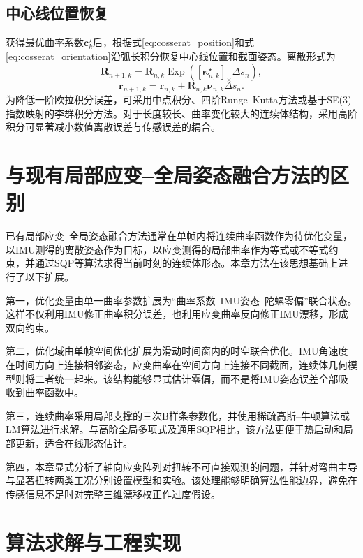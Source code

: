 \subsection{中心线位置恢复}

获得最优曲率系数$\bm c_k^{\star}$后，根据式\eqref{eq:cosserat_position}和式\eqref{eq:cosserat_orientation}沿弧长积分恢复中心线位置和截面姿态。离散形式为
\begin{equation}
    \bm R_{n+1,k}
    =\bm R_{n,k}
    \operatorname{Exp}\left(
    [\bm\kappa_{n,k}^{\star}]_{\times}\Delta s_n
    \right),
\end{equation}
\begin{equation}
    \bm r_{n+1,k}
    =\bm r_{n,k}
    +\bm R_{n,k}\bm\nu_{n,k}\Delta s_n.
    \label{eq:centerline_discrete_integration}
\end{equation}
为降低一阶欧拉积分误差，可采用中点积分、四阶Runge--Kutta方法或基于SE(3)指数映射的李群积分方法。对于长度较长、曲率变化较大的连续体结构，采用高阶积分可显著减小数值离散误差与传感误差的耦合。

\section{与现有局部应变--全局姿态融合方法的区别}
\label{sec:difference_existing}

已有局部应变--全局姿态融合方法通常在单帧内将连续曲率函数作为待优化变量，以IMU测得的离散姿态作为目标，以应变测得的局部曲率作为等式或不等式约束，并通过SQP等算法求得当前时刻的连续体形态\cite{an2024shape}。本章方法在该思想基础上进行了以下扩展。

第一，优化变量由单一曲率参数扩展为“曲率系数--IMU姿态--陀螺零偏”联合状态。这样不仅利用IMU修正曲率积分误差，也利用应变曲率反向修正IMU漂移，形成双向约束。

第二，优化域由单帧空间优化扩展为滑动时间窗内的时空联合优化。IMU角速度在时间方向上连接相邻姿态，应变曲率在空间方向上连接不同截面，连续体几何模型则将二者统一起来。该结构能够显式估计零偏，而不是将IMU姿态误差全部吸收到曲率函数中。

第三，连续曲率采用局部支撑的三次B样条参数化，并使用稀疏高斯--牛顿算法或LM算法进行求解。与高阶全局多项式及通用SQP相比，该方法更便于热启动和局部更新，适合在线形态估计。

第四，本章显式分析了轴向应变阵列对扭转不可直接观测的问题，并针对弯曲主导与显著扭转两类工况分别设置模型和实验。该处理能够明确算法性能边界，避免在传感信息不足时对完整三维漂移校正作过度假设。

\section{算法求解与工程实现}
\label{sec:solver_implementation}

